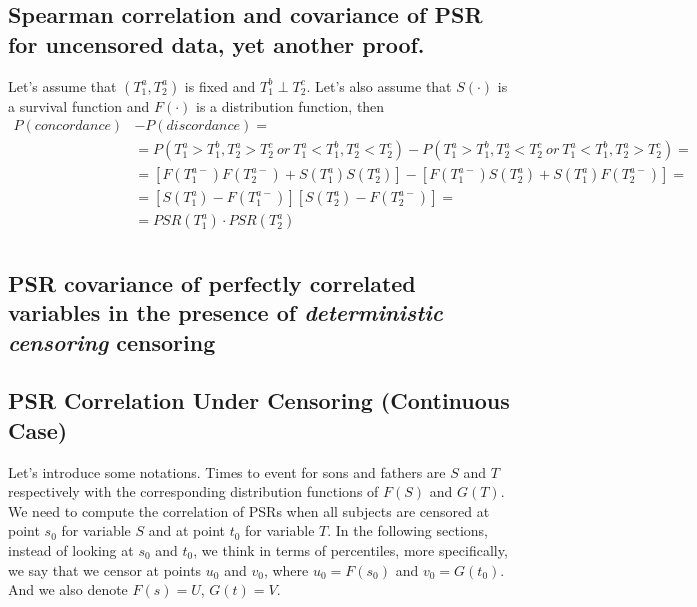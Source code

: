 \documentclass[]{article}
\begin{document}
\subsection{Spearman correlation and covariance of PSR for uncensored data, yet another proof.}
Let's assume that $(T^a_1, T^a_2)$ is fixed and $T^b_1 \perp T^c_2$. Let's also assume that $S(\cdot)$ is a survival function and $F(\cdot)$ is a distribution function, then
	$$
	\begin{aligned}
		P(concordance) &- P(discordance) = \\
      &=P(T^a_1>T^b_1, T^a_2 > T^c_2 ~or ~T^a_1<T^b_1, T^a_2 < T^c_2) - P(T^a_1>T^b_1, T^a_2 < T^c_2 ~or ~T^a_1<T^b_1, T^a_2 > T^c_2)=\\
      &=[F(T^{a-}_1)F(T^{a-}_2) + S(T^a_1) S(T^a_2)] - [ F(T^{a-}_1) S(T^a_2) + S(T^a_1)F(T^{a-}_2)]=\\
      &=[S(T^a_1) - F(T^{a-}_1)][S(T^{a}_2) -F(T^{a-}_2)]=\\
      &=PSR(T^a_1)\cdot PSR(T^a_2)\\
	\end{aligned}
	$$

\subsection{PSR covariance of perfectly correlated variables in the presence of \emph{deterministic censoring} censoring}

\subsection{PSR Correlation Under Censoring (Continuous Case)}

Let's introduce some notations. Times to event for sons and fathers are $S$ and $T$ respectively with the corresponding distribution functions of $F(S)$ and $G(T)$. We need to compute the correlation of PSRs when all subjects are censored at point $s_0$ for variable $S$ and at point $t_0$ for variable $T$. In the following sections, instead of looking at $s_0$ and $t_0$, we think in terms of percentiles, more specifically, we say that we censor at points $u_0$ and $v_0$, where $u_0 = F(s_0)$ and $v_0 = G(t_0)$. And we also denote $F(s)=U$, $G(t)=V$. 
\end{document}

